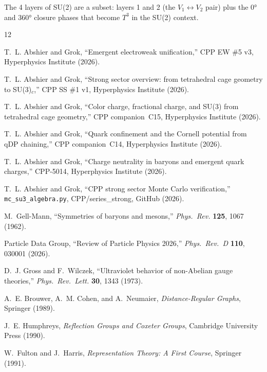 \documentclass[11pt,a4paper]{article}
\begin{document}
The 4 layers of SU(2) are a subset: layers 1 and 2 (the
$V_1 \leftrightarrow V_2$ pair) plus the 0° and 360° closure phases
that become $T^3$ in the SU(2) context.


\begin{thebibliography}{12}

T.~L. Abshier and Grok,
``Emergent electroweak unification,''
CPP EW \#5 v3, Hyperphysics Institute (2026).

T.~L. Abshier and Grok,
``Strong sector overview: from tetrahedral cage geometry to SU(3)$_c$,''
CPP SS \#1 v1, Hyperphysics Institute (2026).

T.~L. Abshier and Grok,
``Color charge, fractional charge, and SU(3) from tetrahedral cage geometry,''
CPP companion~C15, Hyperphysics Institute (2026).

T.~L. Abshier and Grok,
``Quark confinement and the Cornell potential from qDP chaining,''
CPP companion~C14, Hyperphysics Institute (2026).

T.~L. Abshier and Grok,
``Charge neutrality in baryons and emergent quark charges,''
CPP-5014, Hyperphysics Institute (2026).

T.~L. Abshier and Grok,
``CPP strong sector Monte Carlo verification,''
\texttt{mc\_su3\_algebra.py},
CPP/series\_strong, GitHub (2026).

M.~Gell-Mann,
``Symmetries of baryons and mesons,''
\textit{Phys.\ Rev.} \textbf{125}, 1067 (1962).

Particle Data Group,
``Review of Particle Physics 2026,''
\textit{Phys.\ Rev.\ D} \textbf{110}, 030001 (2026).

D.~J. Gross and F.~Wilczek,
``Ultraviolet behavior of non-Abelian gauge theories,''
\textit{Phys.\ Rev.\ Lett.} \textbf{30}, 1343 (1973).

A.~E. Brouwer, A.~M. Cohen, and A.~Neumaier,
\textit{Distance-Regular Graphs}, Springer (1989).

J.~E. Humphreys,
\textit{Reflection Groups and Coxeter Groups},
Cambridge University Press (1990).

W.~Fulton and J.~Harris,
\textit{Representation Theory: A First Course},
Springer (1991).

\end{thebibliography}
\end{document}
